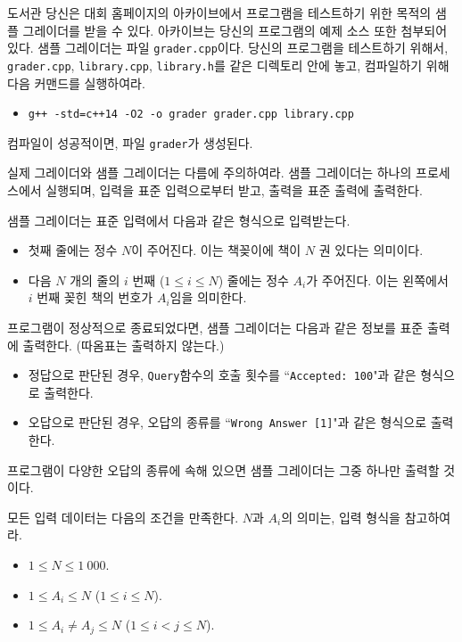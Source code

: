 \begin{problem}{도서관}
	당신은 대회 홈페이지의 아카이브에서 프로그램을 테스트하기 위한 목적의 샘플 그레이더를 받을 수 있다. 아카이브는 당신의 프로그램의 예제 소스 또한 첨부되어 있다.
	샘플 그레이더는 파일 \texttt{grader.cpp}이다. 당신의 프로그램을 테스트하기 위해서, \texttt{grader.cpp}, \texttt{library.cpp}, \texttt{library.h}를 같은 디렉토리 안에 놓고, 컴파일하기 위해 다음 커맨드를 실행하여라.
	
	\begin{itemize}
		\item \texttt{g++ -std=c++14 -O2 -o grader grader.cpp library.cpp}
	\end{itemize}
	
	컴파일이 성공적이면, 파일 \texttt{grader}가 생성된다.
	
	실제 그레이더와 샘플 그레이더는 다름에 주의하여라. 샘플 그레이더는 하나의 프로세스에서 실행되며, 입력을 표준 입력으로부터 받고, 출력을 표준 출력에 출력한다.
	
	\InputFile
	
	샘플 그레이더는 표준 입력에서 다음과 같은 형식으로 입력받는다.
	
	\begin{itemize}
		\item 첫째 줄에는 정수 $N$이 주어진다. 이는 책꽂이에 책이 $N$ 권 있다는 의미이다.
		\item 다음 $N$ 개의 줄의 $i$ 번째 ($1 \le i \le N$) 줄에는 정수 $A_i$가 주어진다. 이는 왼쪽에서 $i$ 번째 꽂힌 책의 번호가 $A_i$임을 의미한다.
	\end{itemize}

	\OutputFile
	
	프로그램이 정상적으로 종료되었다면, 샘플 그레이더는 다음과 같은 정보를 표준 출력에 출력한다. (따옴표는 출력하지 않는다.)
	
	\begin{itemize}
		\item 정답으로 판단된 경우, \texttt{Query}함수의 호출 횟수를 ``\texttt{Accepted: 100}"과 같은 형식으로 출력한다.
		\item 오답으로 판단된 경우, 오답의 종류를 ``\texttt{Wrong Answer [1]}"과 같은 형식으로 출력한다.
	\end{itemize}
	
	프로그램이 다양한 오답의 종류에 속해 있으면 샘플 그레이더는 그중 하나만 출력할 것이다.
	
	\Constraints
	
	모든 입력 데이터는 다음의 조건을 만족한다. $N$과 $A_i$의 의미는, 입력 형식을 참고하여라.
	
	\begin{itemize}
		\item $1 \le N \le 1\ 000$.
		\item $1 \le A_i \le N$ ($1 \le i \le N$).
		\item $1 \le A_i \ne A_j \le N$ ($1 \le i < j \le N$).
	\end{itemize}
	

\end{problem}
